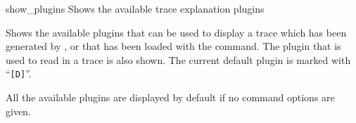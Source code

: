 \begin{nusmvCommand} {show\_plugins} {Shows the available trace
    explanation plugins}


\begin{cmdOpt}

\end{cmdOpt}

Shows the available plugins that can be used to display a trace which
has been generated by \nusmv, or that has been loaded with the
 command. The plugin that is used to read in a
trace is also shown. The current default plugin is marked with ``\texttt{[D]}''.

All the available plugins are displayed by default if no command
options are given.

\end{nusmvCommand}
